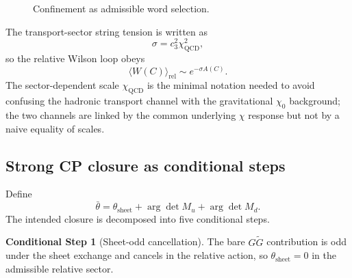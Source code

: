 \documentclass[11pt,a4paper]{article}
\theoremstyle{definition}
\newtheorem{conditionalstep}[theorem]{Conditional Step}
\theoremstyle{remark}
\newcommand{\cthree}{c_3}
\newcommand{\QCD}{\mathrm{QCD}}
\begin{document}
\begin{figure}[t]
\centering
{}
\caption{Confinement as admissible word selection.}
\label{fig:admissible-words}
\end{figure}

The transport-sector string tension is written as
\[
\sigma=\cthree^2\chi_{\QCD}^2,
\]
so the relative Wilson loop obeys
\[
\langle W(C)\rangle_{\mathrm{rel}}\sim e^{-\sigma A(C)}.
\]
The sector-dependent scale $\chi_{\QCD}$ is the minimal notation needed to avoid confusing the hadronic transport channel with the gravitational $\chi_0$ background; the two channels are linked by the common underlying $\chi$ response but not by a naive equality of scales.

\subsection{Strong CP closure as conditional steps}

Define
\begin{equation}
\label{eq:strong-cp}
\bar\theta=\theta_{\mathrm{sheet}}+\arg\det M_u+\arg\det M_d.
\end{equation}
The intended closure is decomposed into five conditional steps.

\begin{conditionalstep}[Sheet-odd cancellation]
The bare $G\widetilde G$ contribution is odd under the sheet exchange and cancels in the relative action, so $\theta_{\mathrm{sheet}}=0$ in the admissible relative sector.
\end{conditionalstep}
\end{document}
